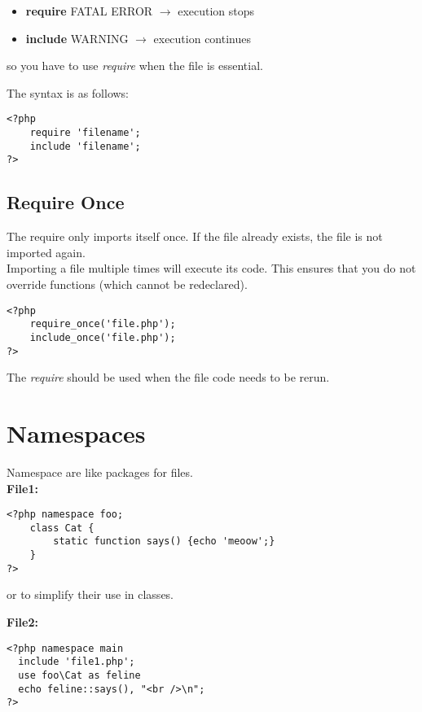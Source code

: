 \documentclass{article}
\begin{document}
\begin{itemize}
    \item \textbf{require} FATAL ERROR \(\rightarrow\) execution stops 
    \item \textbf{include} WARNING \(\rightarrow\) execution continues
\end{itemize}

so you have to use \textit{require} when the file is essential.

The syntax is as follows: 

\begin{lstlisting}
<?php
    require 'filename';
    include 'filename';
?>
\end{lstlisting}

\subsection{Require Once}

The require only imports itself once.
If the file already exists, the file is not imported again.
\\
Importing a file multiple times will execute its code.
This ensures that you do not override functions (which cannot be redeclared).

\begin{lstlisting}
<?php
    require_once('file.php');
    include_once('file.php');
?>
\end{lstlisting}

The \textit{require} should be used when the file code needs to be rerun.

\section{Namespaces}

Namespace are like packages for files. \\

\textbf{File1:}
\begin{lstlisting}
<?php namespace foo;
    class Cat {
        static function says() {echo 'meoow';} 
    }
?>
\end{lstlisting}

or to simplify their use in classes.

\textbf{File2:}
\begin{lstlisting}
<?php namespace main
  include 'file1.php';
  use foo\Cat as feline
  echo feline::says(), "<br />\n";
?>
\end{lstlisting}
\end{document}
